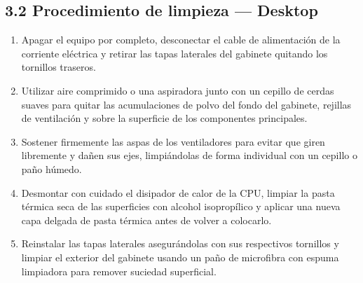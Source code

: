 \documentclass{article}
\begin{document}
\subsection{3.2 Procedimiento de limpieza — Desktop}
\label{sec:orgb260216}
\begin{enumerate}
\item Apagar el equipo por completo, desconectar el cable de alimentación de la corriente eléctrica y retirar las tapas laterales del gabinete quitando los tornillos traseros.
\item Utilizar aire comprimido o una aspiradora junto con un cepillo de cerdas suaves para quitar las acumulaciones de polvo del fondo del gabinete, rejillas de ventilación y sobre la superficie de los componentes principales.
\item Sostener firmemente las aspas de los ventiladores para evitar que giren libremente y dañen sus ejes, limpiándolas de forma individual con un cepillo o paño húmedo.
\item Desmontar con cuidado el disipador de calor de la CPU, limpiar la pasta térmica seca de las superficies con alcohol isopropílico y aplicar una nueva capa delgada de pasta térmica antes de volver a colocarlo.
\item Reinstalar las tapas laterales asegurándolas con sus respectivos tornillos y limpiar el exterior del gabinete usando un paño de microfibra con espuma limpiadora para remover suciedad superficial.
\end{enumerate}
\end{document}
